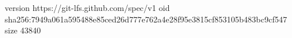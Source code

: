version https://git-lfs.github.com/spec/v1
oid sha256:7949a061a595488e85ced26d777e762a4e28f95e3815cf853105b483bc9cf547
size 43840
